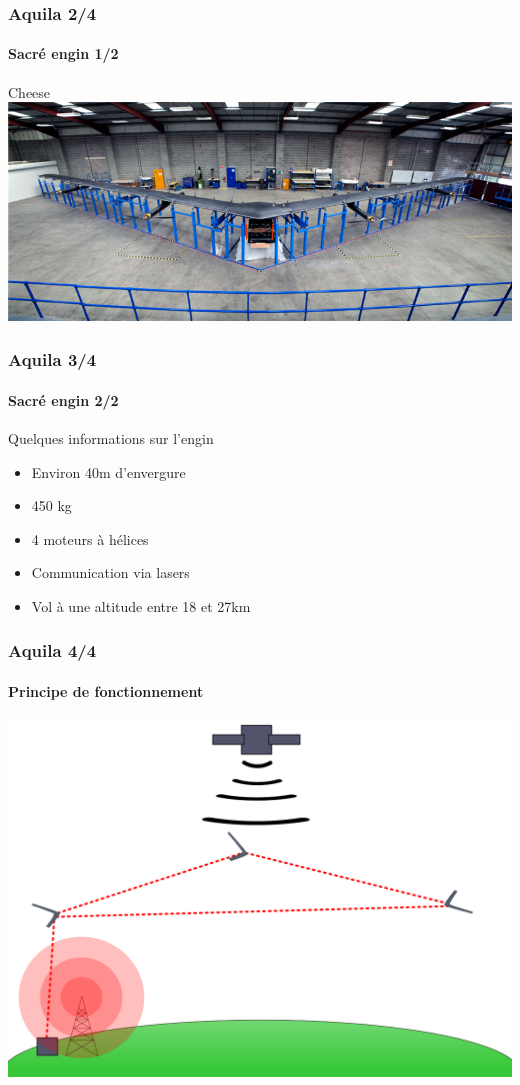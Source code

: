 \documentclass{beamer}
\begin{document}
\begin{frame}
  \frametitle{Aquila 2/4}
  \framesubtitle{Sacré engin 1/2}
  \begin{block}{Cheese}
      \includegraphics[width=\textwidth]{../Images/facebook_aquila.png}
  \end{block}
\end{frame}

\begin{frame}
  \frametitle{Aquila 3/4}
  \framesubtitle{Sacré engin 2/2}
  \begin{block}{Quelques informations sur l'engin}
    \begin{itemize}
      \item Environ 40m d'envergure
      \item 450 kg
      \item 4 moteurs à hélices
      \item Communication via lasers
      \item Vol à une altitude entre 18 et 27km
    \end{itemize}
  \end{block}
\end{frame}

\begin{frame}
  \frametitle{Aquila 4/4}
  \framesubtitle{Principe de fonctionnement}
  \begin{center}
    \includegraphics[width=.9\textwidth]{../Images/schema_aquila.png}
  \end{center}
\end{frame}
\end{document}
